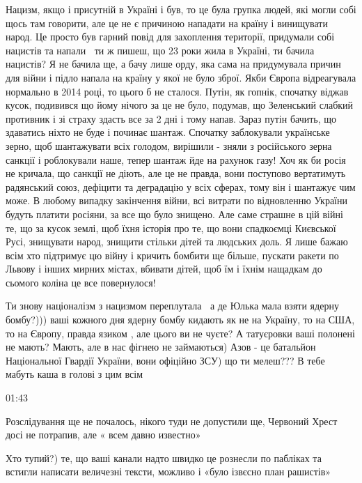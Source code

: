{Нацизм, якщо і присутній в Україні і був, то це була групка людей, які могли
собі щось там говорити, але це не є причиною нападати на країну і винищувати
народ. Це просто був гарний повід для захоплення території, придумали собі
нацистів та напали🤦‍♀️ ти ж пишеш, що 23 роки жила в Україні, ти бачила
нацистів? Я не бачила ще, а бачу лише орду, яка сама на придумувала причин для
війни і підло напала на країну у якої не було зброї. Якби Європа відреагувала
нормально в 2014 році, то цього б не сталося. Путін, як гопнік, спочатку віджав
кусок, подивився що йому нічого за це не було, подумав, що Зеленський слабкий
противник і зі страху здасть все за 2 дні і тому напав. Зараз путін бачить, що
здаватись ніхто не буде і починає шантаж. Спочатку заблокували українське
зерно, щоб шантажувати всіх голодом, вирішили - зняли з російського зерна
санкції і роблокували наше, тепер шантаж йде на рахунок газу! Хоч як би росія
не кричала, що санкції не діють, але це не правда, вони поступово вертатимуть
радянський союз, дефіцити та деградацію у всіх сферах, тому він і шантажує чим
може. В любому випадку закінчення війни, всі витрати по відновленню України
будуть платити росіяни, за все що було знищено. Але саме страшне в цій війні
те, що за кусок землі, щоб їхня історія про те, що вони спадкоємці Києвської
Русі, знищувати народ, знищити стільки дітей та людських доль. Я лише бажаю
всім хто підтримує цю війну і кричить бомбити ще більше, пускати ракети по
Львову і інших мирних містах, вбивати дітей, щоб їм і їхнім нащадкам до сьомого
коліна це все повернулося!


Ти знову націоналізм з нацизмом переплутала🤦‍♀️ а де Юлька мала взяти
ядерну бомбу?))) ваші кожного дня ядерну бомбу кидають як не на Україну, то на
США, то на Європу, правда язиком , але цього ви не чуєте? А татуєровки ваші
полонені не мають? Мають, але в нас фігнею не займаються) Азов - це батальйон
Національної Гвардії України, вони офіційно ЗСУ) що ти мелеш??? В тебе мабуть
каша в голові з цим всім

01:43

Розслідування ще не почалось, нікого туди не допустили ще, Червоний Хрест досі не потрапив, але « всем давно известно»🤔

Хто тупий?) те, що ваші канали надто швидко це рознесли по пабліках та встигли
написати величезні тексти, можливо і «було ізвєсно план рашистів»

}
